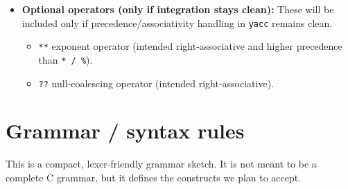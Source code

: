 \documentclass[11pt]{article}
\begin{document}
\begin{itemize}
	\textbf{Foreach syntax:}
	\begin{lstlisting}
foreach(x in array) { ... }
foreach(c in "hello") { ... }
	\end{lstlisting}

	\item \textbf{Optional operators (only if integration stays clean):} These will be included only if precedence/associativity handling in \texttt{yacc} remains clean.
	\begin{itemize}
		\item \texttt{**} exponent operator (intended right-associative and higher precedence than \texttt{* / \%}).
		\item \texttt{??} null-coalescing operator (intended right-associative).
	\end{itemize}
\end{itemize}

\section{Grammar / syntax rules}
This is a compact, lexer-friendly grammar sketch.
It is not meant to be a complete C grammar, but it defines the constructs we plan to accept.
\end{document}
